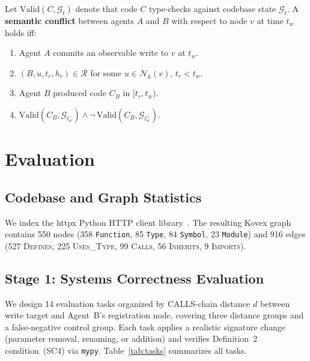 \documentclass[12pt]{article}
\begin{document}
\begin{kovexdef}[title={Definition~2: Semantic Conflict}]
Let $\mathrm{Valid}(C, \mathcal{G}_t)$ denote that code $C$ type-checks against
codebase state $\mathcal{G}_t$. A \textbf{semantic conflict} between agents $A$
and $B$ with respect to node $v$ at time $t_w$ holds iff:
\begin{enumerate}[label=\textnormal{(SC\arabic*)}, leftmargin=3em, itemsep=0pt]
  \item Agent $A$ commits an observable write to $v$ at $t_w$.
  \item $(B,u,t_r,h_r) \in \mathcal{R}$ for some $u \in \mathcal{N}_k(v)$,
        $t_r < t_w$.
  \item Agent $B$ produced code $C_B$ in $[t_r, t_w)$.
  \item $\mathrm{Valid}(C_B,\mathcal{G}_{t_w^-}) \wedge
        \neg\,\mathrm{Valid}(C_B,\mathcal{G}_{t_w^+})$.
\end{enumerate}
\end{kovexdef}

\section{Evaluation}

\subsection{Codebase and Graph Statistics}

We index the httpx Python HTTP client library~\cite{httpx}. The resulting
Kovex graph contains 550 nodes (358 \texttt{Function}, 85 \texttt{Type},
84 \texttt{Symbol}, 23 \texttt{Module}) and 916 edges (527 \textsc{Defines},
225 \textsc{Uses\_Type}, 99 \textsc{Calls}, 56 \textsc{Inherits},
9 \textsc{Imports}).

\subsection{Stage 1: Systems Correctness Evaluation}

We design 14 evaluation tasks organized by CALLS-chain distance $d$ between
write target and Agent~B's registration node, covering three distance groups
and a false-negative control group. Each task applies a realistic signature
change (parameter removal, renaming, or addition) and verifies Definition~2
condition~(SC4) via \texttt{mypy}. Table~\ref{tab:tasks} summarizes all tasks.
\end{document}
